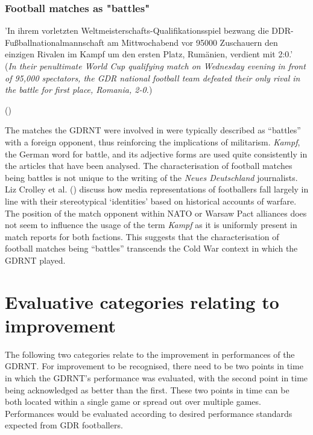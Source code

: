 \subsubsection*{Football matches as "battles"}

\begin{displayquote}
\begin{small}
'In ihrem vorletzten Weltmeisterschafts-Qualifikationsspiel bezwang die DDR-Fußballnationalmannschaft am Mittwochabend vor 95000 Zuschauern den einzigen Rivalen im Kampf um den ersten Platz, Rumänien, verdient mit 2:0.'\\
(\textit{In their penultimate World Cup qualifying match on Wednesday evening in front of 95,000 spectators, the GDR national football team defeated their only rival in the battle for first place, Romania, 2-0.})\
\begin{flushright}\footnotesize (\cite{nd19730927})\end{flushright}
\end{small}
\end{displayquote}

The matches the GDRNT were involved in were typically described as “battles” with a foreign opponent, thus reinforcing the implications of militarism. \textit{Kampf}, the German word for battle, and its adjective forms are used quite consistently in the articles that have been analysed. The characterisation of football matches being battles is not unique to the writing of the \textit{Neues Deutschland} journalists. Liz Crolley et al. (\citeyear{crolleyhandjeutter2000}) discuss how media representations of footballers fall largely in line with their stereotypical ‘identities’ based on historical accounts of warfare. The position of the match opponent within NATO or Warsaw Pact alliances does not seem to influence the usage of the term \textit{Kampf} as it is uniformly present in match reports for both factions. This suggests that the characterisation of football matches being “battles” transcends the Cold War context in which the GDRNT played.

\section*{Evaluative categories relating to improvement}

The following two categories relate to the improvement in performances of the GDRNT. For improvement to be recognised, there need to be two points in time in which the GDRNT’s performance was evaluated, with the second point in time being acknowledged as better than the first. These two points in time can be both located within a single game or spread out over multiple games. Performances would be evaluated according to desired performance standards expected from GDR footballers.

